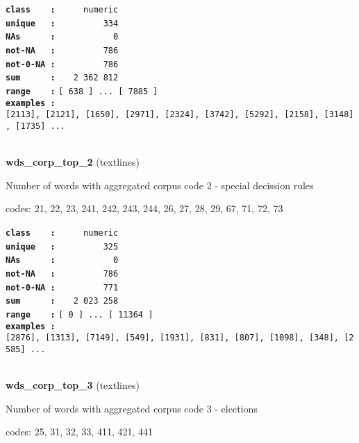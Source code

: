 \documentclass[]{article}
\begin{document}
\textbf{\texttt{class\ \ \ \ :}} \texttt{~~~~~numeric}\\
\textbf{\texttt{unique\ \ \ :}} \texttt{~~~~~~~~~334}\\
\textbf{\texttt{NAs\ \ \ \ \ \ :}} \texttt{~~~~~~~~~~~0}\\
\textbf{\texttt{not-NA\ \ \ :}} \texttt{~~~~~~~~~786}\\
\textbf{\texttt{not-0-NA\ :}} \texttt{~~~~~~~~~786}\\
\textbf{\texttt{sum\ \ \ \ \ \ :}} \texttt{~~~2~362~812}\\
\textbf{\texttt{range\ \ \ \ :}}
\texttt{{[}\ 638\ {]}\ ...\ {[}\ 7885\ {]}}\\
\textbf{\texttt{examples\ :}}
\texttt{{[}2113{]},\ {[}2121{]},\ {[}1650{]},\ {[}2971{]},\ {[}2324{]},\ {[}3742{]},\ {[}5292{]},\ {[}2158{]},\ {[}3148{]},\ {[}1735{]}\ ...}\\

~

\textbf{wds\_corp\_top\_2} (textlines)

Number of words with aggregated corpus code 2 - special decission rules

codes: 21, 22, 23, 241, 242, 243, 244, 26, 27, 28, 29, 67, 71, 72, 73

\textbf{\texttt{class\ \ \ \ :}} \texttt{~~~~~numeric}\\
\textbf{\texttt{unique\ \ \ :}} \texttt{~~~~~~~~~325}\\
\textbf{\texttt{NAs\ \ \ \ \ \ :}} \texttt{~~~~~~~~~~~0}\\
\textbf{\texttt{not-NA\ \ \ :}} \texttt{~~~~~~~~~786}\\
\textbf{\texttt{not-0-NA\ :}} \texttt{~~~~~~~~~771}\\
\textbf{\texttt{sum\ \ \ \ \ \ :}} \texttt{~~~2~023~258}\\
\textbf{\texttt{range\ \ \ \ :}}
\texttt{{[}\ 0\ {]}\ ...\ {[}\ 11364\ {]}}\\
\textbf{\texttt{examples\ :}}
\texttt{{[}2876{]},\ {[}1313{]},\ {[}7149{]},\ {[}549{]},\ {[}1931{]},\ {[}831{]},\ {[}807{]},\ {[}1098{]},\ {[}348{]},\ {[}2585{]}\ ...}\\

~

\textbf{wds\_corp\_top\_3} (textlines)

Number of words with aggregated corpus code 3 - elections

codes: 25, 31, 32, 33, 411, 421, 441
\end{document}
